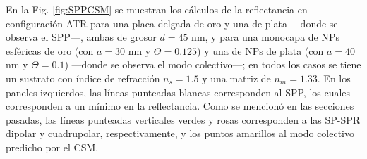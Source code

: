En la Fig. \ref{fig:SPPCSM} se muestran los cálculos de la reflectancia en configuración ATR para una placa delgada de oro y una de plata ---donde se observa el SPP---, ambas de grosor $d=45$ nm, y para una monocapa de NPs esféricas de oro (con $a=30$ nm y $\Theta=0.125$) y una de NPs de plata (con $a=40$ nm y $\Theta=0.1$) ---donde se observa el modo colectivo---; en todos los casos se tiene un sustrato con índice de refracción $n_s=1.5$ y una matriz de $n_m=1.33$. En los paneles izquierdos, las líneas punteadas blancas corresponden al SPP, los cuales corresponden a un mínimo en la reflectancia. Como se mencionó en las secciones pasadas, las líneas punteadas verticales verdes y rosas corresponden a las SP-SPR dipolar y cuadrupolar, respectivamente, y los puntos amarillos al modo colectivo predicho por el CSM.

\begin{figure}[h!]\centering
{}
\end{figure}
